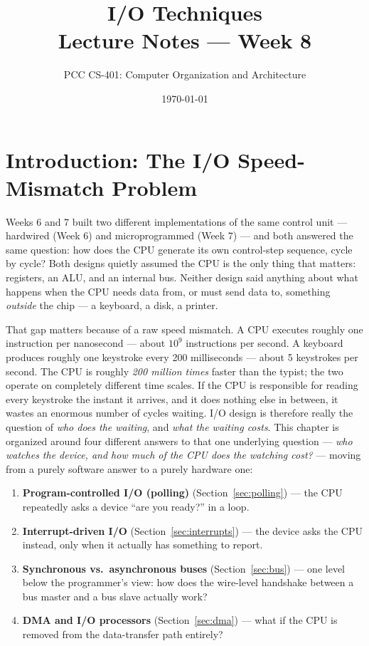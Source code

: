 \documentclass[11pt]{article}
\title{I/O Techniques\\\large Lecture Notes --- Week 8}
\author{PCC CS-401: Computer Organization and Architecture}
\date{\today}
\begin{document}
\maketitle

\section{Introduction: The I/O Speed-Mismatch Problem}
\label{sec:intro}

Weeks 6 and 7 built two different implementations of the same control unit --- hardwired (Week 6) and microprogrammed (Week 7) --- and both answered the same question: how does the CPU generate its own control-step sequence, cycle by cycle? Both designs quietly assumed the CPU is the only thing that matters: registers, an ALU, and an internal bus. Neither design said anything about what happens when the CPU needs data from, or must send data to, something \emph{outside} the chip --- a keyboard, a disk, a printer.

That gap matters because of a raw speed mismatch. A CPU executes roughly one instruction per nanosecond --- about $10^9$ instructions per second. A keyboard produces roughly one keystroke every 200 milliseconds --- about 5 keystrokes per second. The CPU is roughly \emph{200 million times} faster than the typist; the two operate on completely different time scales. If the CPU is responsible for reading every keystroke the instant it arrives, and it does nothing else in between, it wastes an enormous number of cycles waiting. I/O design is therefore really the question of \emph{who does the waiting}, and \emph{what the waiting costs}. This chapter is organized around four different answers to that one underlying question --- \emph{who watches the device, and how much of the CPU does the watching cost?} --- moving from a purely software answer to a purely hardware one:

\begin{enumerate}
  \item \textbf{Program-controlled I/O (polling)} (Section~\ref{sec:polling}) --- the CPU repeatedly asks a device ``are you ready?'' in a loop.
  \item \textbf{Interrupt-driven I/O} (Section~\ref{sec:interrupts}) --- the device asks the CPU instead, only when it actually has something to report.
  \item \textbf{Synchronous vs.\ asynchronous buses} (Section~\ref{sec:bus}) --- one level below the programmer's view: how does the wire-level handshake between a bus master and a bus slave actually work?
  \item \textbf{DMA and I/O processors} (Section~\ref{sec:dma}) --- what if the CPU is removed from the data-transfer path entirely?
\end{enumerate}
\end{document}

